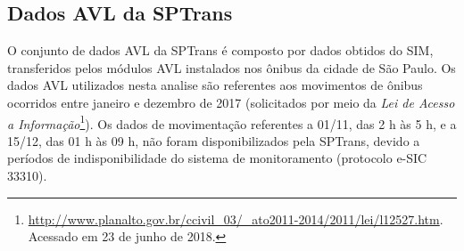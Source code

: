 \documentclass[
	12pt,				%
	oneside,			%
	a4paper,			%
	english,			%
	brazil				%
	]{abntex2ppgsi}
\begin{document}
{{{\subsection{Dados AVL da SPTrans}

O conjunto de dados AVL da SPTrans é composto por dados obtidos do SIM, transferidos pelos módulos AVL instalados nos ônibus da cidade de São Paulo. Os dados AVL utilizados nesta analise são referentes aos movimentos de ônibus ocorridos entre janeiro e dezembro de 2017 (solicitados por meio da \textit{Lei de Acesso a Informação}\footnote{\url{http://www.planalto.gov.br/ccivil\_03/\_ato2011-2014/2011/lei/l12527.htm}. Acessado em 23 de junho de 2018.}). Os dados de movimentação referentes a 01/11, das 2 h às 5 h, e a 15/12, das 01 h às 09 h, não foram disponibilizados pela SPTrans,  devido a períodos de indisponibilidade do sistema de monitoramento (protocolo e-SIC 33310).

}}}
\end{document}
